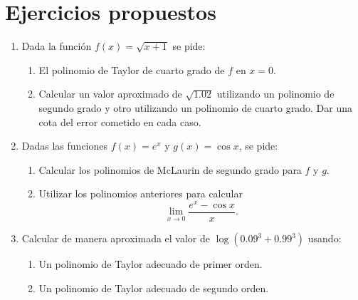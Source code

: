 \section{Ejercicios propuestos}

\begin{enumerate}[leftmargin=*]
\item  Dada la función $f(x)=\sqrt{x+1}$ se pide:
\begin{enumerate}
\item  El polinomio de Taylor de cuarto grado de $f$ en $x=0$.

\item  Calcular un valor aproximado de $\sqrt{1.02}$ utilizando un polinomio de segundo grado y otro utilizando un
polinomio de cuarto grado. 
Dar una cota del error cometido en cada caso.
\end{enumerate}

\item Dadas las funciones
$f(x)=e^x$ y $g(x)=\cos x$, se pide:
\begin{enumerate}
\item  Calcular los polinomios de McLaurin de segundo grado para $f$ y $g$.

\item  Utilizar los polinomios anteriores para calcular \[ \lim_{x\rightarrow 0}\frac{e^x-\cos x}{x}.\]
\end{enumerate}

\item Calcular de manera aproximada el valor de $\log(0.09^3+0.99^3)$ usando:
\begin{enumerate}
\item Un polinomio de Taylor adecuado de primer orden.
\item Un polinomio de Taylor adecuado de segundo orden.
\end{enumerate}
\end{enumerate}
